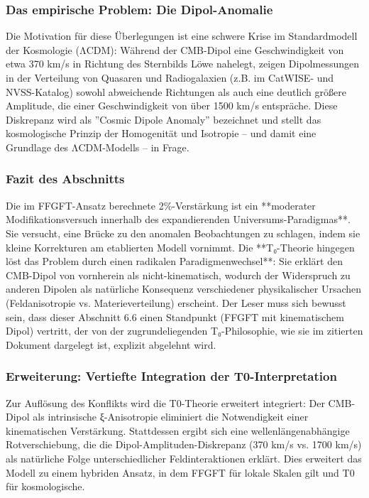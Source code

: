 \documentclass[12pt,a4paper]{article}
\begin{document}
	\subsubsection*{Das empirische Problem: Die Dipol-Anomalie}
	
	Die Motivation für diese Überlegungen ist eine schwere Krise im Standardmodell der Kosmologie (ΛCDM): Während der CMB-Dipol eine Geschwindigkeit von etwa 370 km/s in Richtung des Sternbilds Löwe nahelegt, zeigen Dipolmessungen in der Verteilung von Quasaren und Radiogalaxien (z.B. im CatWISE- und NVSS-Katalog) sowohl abweichende Richtungen als auch eine deutlich größere Amplitude, die einer Geschwindigkeit von über 1500 km/s entspräche. Diese Diskrepanz wird als ''Cosmic Dipole Anomaly'' bezeichnet und stellt das kosmologische Prinzip der Homogenität und Isotropie – und damit eine Grundlage des ΛCDM-Modells – in Frage.
	
	\subsubsection*{Fazit des Abschnitts}
	
	Die im FFGFT-Ansatz berechnete 2\%-Verstärkung ist ein **moderater Modifikationsversuch innerhalb des expandierenden Universums-Paradigmas**. Sie versucht, eine Brücke zu den anomalen Beobachtungen zu schlagen, indem sie kleine Korrekturen am etablierten Modell vornimmt. Die **T₀-Theorie hingegen löst das Problem durch einen radikalen Paradigmenwechsel**: Sie erklärt den CMB-Dipol von vornherein als nicht-kinematisch, wodurch der Widerspruch zu anderen Dipolen als natürliche Konsequenz verschiedener physikalischer Ursachen (Feldanisotropie vs. Materieverteilung) erscheint. Der Leser muss sich bewusst sein, dass dieser Abschnitt 6.6 einen Standpunkt (FFGFT mit kinematischem Dipol) vertritt, der von der zugrundeliegenden T₀-Philosophie, wie sie im zitierten Dokument dargelegt ist, explizit abgelehnt wird.
	
	\subsubsection*{Erweiterung: Vertiefte Integration der T0-Interpretation}
	Zur Auflösung des Konflikts wird die T0-Theorie erweitert integriert: Der CMB-Dipol als intrinsische ξ-Anisotropie eliminiert die Notwendigkeit einer kinematischen Verstärkung. Stattdessen ergibt sich eine wellenlängenabhängige Rotverschiebung, die die Dipol-Amplituden-Diskrepanz (370 km/s vs. 1700 km/s) als natürliche Folge unterschiedlicher Feldinteraktionen erklärt. Dies erweitert das Modell zu einem hybriden Ansatz, in dem FFGFT für lokale Skalen gilt und T0 für kosmologische.
	
\end{document}
